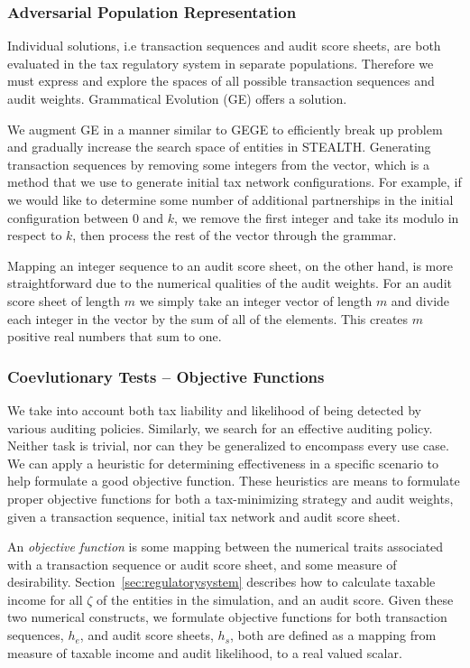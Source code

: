 \subsubsection{Adversarial Population Representation}
\label{sec:grammaticalevolution}

Individual solutions, i.e transaction sequences and audit score
sheets, are both evaluated in the tax regulatory system in separate
populations. Therefore we must express and explore the spaces of all
possible transaction sequences and audit weights. Grammatical
Evolution (GE) offers a solution.

We augment GE in a manner similar to GEGE to efficiently break up
problem and gradually increase the search space of entities in
STEALTH. Generating transaction sequences by removing some integers
from the vector, which is a method that we use to generate initial tax
network configurations. For example, if we would like to determine
some number of additional partnerships in the initial configuration
between $0$ and $k$, we remove the first integer and take its modulo
in respect to $k$, then process the rest of the vector through the
grammar.

Mapping an integer sequence to an audit score sheet, on the other
hand, is more straightforward due to the numerical qualities of the
audit weights. For an audit score sheet of length $m$ we simply take
an integer vector of length $m$ and divide each integer in the vector
by the sum of all of the elements. This creates $m$ positive real
numbers that sum to one.

\subsubsection{Coevlutionary Tests -- Objective Functions}
\label{sec:objectivefunction}

We take into account both tax liability and likelihood of being
detected by various auditing policies. Similarly, we search for an
effective auditing policy. Neither task is trivial, nor can they be
generalized to encompass every use case. We can apply a heuristic for
determining effectiveness in a specific scenario to help formulate a
good objective function. These heuristics are means to formulate
proper objective functions for both a tax-minimizing strategy and
audit weights, given a transaction sequence, initial tax network and
audit score sheet.

An \textit{objective function} is some mapping between the numerical
traits associated with a transaction sequence or audit score sheet,
and some measure of desirability. Section~\ref{sec:regulatorysystem}
describes how to calculate taxable income for all $\zeta$ of the
entities in the simulation, and an audit score. Given these two
numerical constructs, we formulate objective functions for both
transaction sequences, $h_e$, and audit score sheets, $h_s$, both are
defined as a mapping from measure of taxable income and audit
likelihood, to a real valued scalar.

